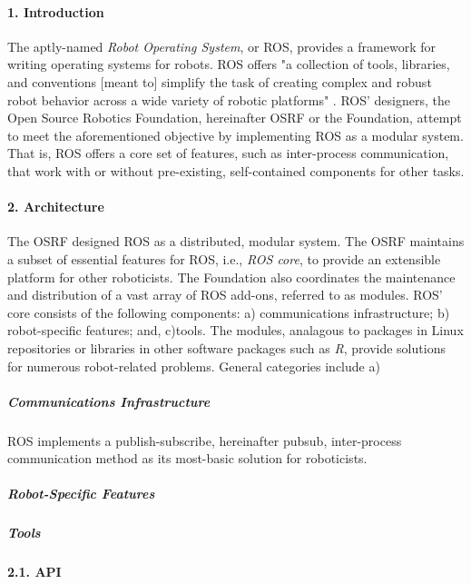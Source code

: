 \documentclass[9pt,twocolumn,twoside]{styles/osajnl}
\begin{document}
\paragraph{1. Introduction}

The aptly-named \textit{Robot Operating System}, or ROS, provides a framework for writing operating systems for robots.  ROS offers "a collection of tools, libraries, and conventions [meant to] simplify the task of creating complex and robust robot behavior across a wide variety of robotic platforms" \cite{www-rosmain}. ROS' designers, the Open Source Robotics Foundation, hereinafter OSRF or the Foundation, attempt to meet the aforementioned objective by implementing ROS as a modular system.  That is, ROS offers a core set of features, such as inter-process communication, that work with or without pre-existing, self-contained components for other tasks.

\paragraph{2. Architecture} 

The OSRF designed ROS as a distributed, modular system.  The OSRF maintains a subset of essential features for ROS, i.e., \textit{ROS core}, to provide an extensible platform for other roboticists.  The Foundation also coordinates the maintenance and distribution of a vast array of ROS add-ons, referred to as modules.  ROS' core consists of the following components: a) communications infrastructure; b) robot-specific features; and, c)tools.  The modules, analagous to packages in Linux repositories or libraries in other software packages such as \textit{R}, provide solutions for numerous robot-related problems.  General categories include a) 

\subparagraph{Communications Infrastructure}
ROS implements a publish-subscribe, hereinafter pubsub, inter-process communication method as its most-basic solution for roboticists.  


\subparagraph{Robot-Specific Features}

\subparagraph{Tools}


\paragraph{2.1. API}
\end{document}
